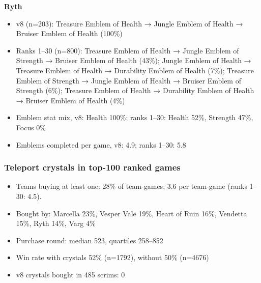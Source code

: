 \documentclass[
  10pt,
]{article}
\providecommand{\tightlist}{%
  \setlength{\itemsep}{0pt}\setlength{\parskip}{0pt}}
\begin{document}
\textbf{Ryth}

\begin{itemize}
\tightlist
\item
  v8 (n=203): Treasure Emblem of Health → Jungle Emblem of Health →
  Bruiser Emblem of Health (100\%)
\item
  Ranks 1--30 (n=800): Treasure Emblem of Health → Jungle Emblem of
  Strength → Bruiser Emblem of Health (43\%); Jungle Emblem of Health →
  Treasure Emblem of Health → Durability Emblem of Health (7\%);
  Treasure Emblem of Strength → Jungle Emblem of Health → Bruiser Emblem
  of Strength (6\%); Treasure Emblem of Health → Durability Emblem of
  Health → Bruiser Emblem of Health (4\%)
\item
  Emblem stat mix, v8: Health 100\%; ranks 1--30: Health 52\%, Strength
  47\%, Focus 0\%
\item
  Emblems completed per game, v8: 4.9; ranks 1--30: 5.8
\end{itemize}

\subsubsection{Teleport crystals in top-100 ranked
games}\label{teleport-crystals-in-top-100-ranked-games-1}

\begin{itemize}
\tightlist
\item
  Teams buying at least one: 28\% of team-games; 3.6 per team-game
  (ranks 1--30: 4.5).
\item
  Bought by: Marcella 23\%, Vesper Vale 19\%, Heart of Ruin 16\%,
  Vendetta 15\%, Ryth 14\%, Varg 4\%
\item
  Purchase round: median 523, quartiles 258--852
\item
  Win rate with crystals 52\% (n=1792), without 50\% (n=4676)
\item
  v8 crystals bought in 485 scrims: 0
\end{itemize}
\end{document}
